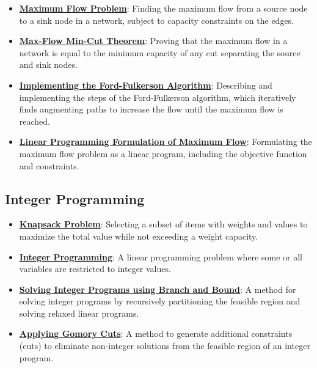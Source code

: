 \documentclass{article}%
\begin{document}
\begin{itemize}[leftmargin=*]
\item \href{https://www.math.purdue.edu/~yipn/421/2024-11-19-MaxFlowMinCut.pdf#page=1}{\textbf{Maximum Flow Problem}}: Finding the maximum flow from a source node to a sink node in a network, subject to capacity constraints on the edges.%
\item \href{https://www.math.purdue.edu/~yipn/421/2024-11-19-MaxFlowMinCut.pdf#page=8}{\textbf{Max-Flow Min-Cut Theorem}}: Proving that the maximum flow in a network is equal to the minimum capacity of any cut separating the source and sink nodes.%
\item \href{https://www.math.purdue.edu/~yipn/421/2024-11-19-MaxFlowMinCut.pdf#page=10}{\textbf{Implementing the Ford-Fulkerson Algorithm}}: Describing and implementing the steps of the Ford-Fulkerson algorithm, which iteratively finds augmenting paths to increase the flow until the maximum flow is reached.%
\item \href{https://www.math.purdue.edu/~yipn/421/2024-11-19-MaxFlowMinCut.pdf#page=14}{\textbf{Linear Programming Formulation of Maximum Flow}}: Formulating the maximum flow problem as a linear program, including the objective function and constraints.%
\end{itemize}

%
\subsection{Integer Programming}%
\label{subsec:IntegerProgramming}%
\begin{itemize}[leftmargin=*]%
\item \href{https://www.math.purdue.edu/~yipn/421/2024-10-28-ApplsLinProg.pdf#page=24}{\textbf{Knapsack Problem}}: Selecting a subset of items with weights and values to maximize the total value while not exceeding a weight capacity.%
\item \href{https://www.math.purdue.edu/~yipn/421/2024-10-31-IntLinProg.pdf#page=1}{\textbf{Integer Programming}}: A linear programming problem where some or all variables are restricted to integer values.%
\item \href{https://www.math.purdue.edu/~yipn/421/2024-10-31-IntLinProg.pdf#page=5}{\textbf{Solving Integer Programs using Branch and Bound}}: A method for solving integer programs by recursively partitioning the feasible region and solving relaxed linear programs.%
\item \href{https://www.math.purdue.edu/~yipn/421/2024-10-31-IntLinProg.pdf#page=15}{\textbf{Applying Gomory Cuts}}: A method to generate additional constraints (cuts) to eliminate non-integer solutions from the feasible region of an integer program.%
\end{itemize}
\end{document}
